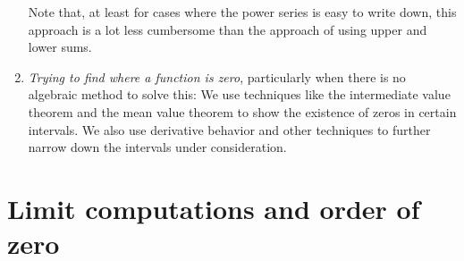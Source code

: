 \documentclass[10pt]{amsart}
\begin{document}
\begin{enumerate}
  Note that, at least for cases where the power series is easy to
  write down, this approach is a lot less cumbersome than the approach
  of using upper and lower sums.
\item {\em Trying to find where a function is zero}, particularly when
  there is no algebraic method to solve this: We use techniques like
  the intermediate value theorem and the mean value theorem to show
  the existence of zeros in certain intervals. We also use derivative
  behavior and other techniques to further narrow down the intervals
  under consideration.
\end{enumerate}

\section{Limit computations and order of zero}
\end{document}
